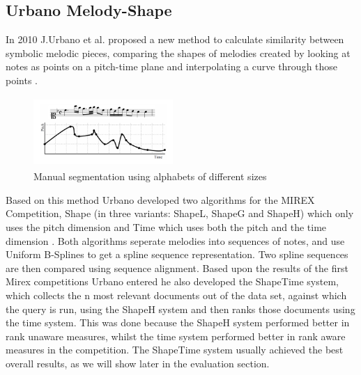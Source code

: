 \documentclass{llncs}
\begin{document}
		\subsection{Urbano Melody-Shape}
        In 2010 J.Urbano et al. proposed a new method to calculate similarity between symbolic melodic pieces, comparing the shapes of melodies created by looking at notes as points on a pitch-time plane and interpolating a curve through those points \cite{five_point_five}.
           \begin{figure}[h!]
			\centering
        \includegraphics[width=200px,height=100px,keepaspectratio]{one_of_five_point_one}
			\caption{Manual segmentation using alphabets of different sizes \cite{two_point_four}}
        \end{figure}
        Based on this method Urbano developed two algorithms for the MIREX Competition, Shape (in three variants: ShapeL, ShapeG and ShapeH) which only uses the pitch dimension and Time which uses both the pitch and the time dimension \cite{five_point_two}. Both algorithms seperate melodies into sequences of notes, and use Uniform B-Splines to get a spline sequence representation. Two spline sequences are then compared using sequence alignment. Based upon the results of the first Mirex competitions Urbano entered he also developed the ShapeTime system, which collects the n most relevant documents out of the data set, against which the query is run, using the ShapeH system and then ranks those documents using the time system. This was done because the ShapeH system performed better in rank unaware measures, whilst the time system performed better in rank aware measures in the competition. The ShapeTime system usually achieved the best overall results, as we will show later in the evaluation section.
\end{document}
